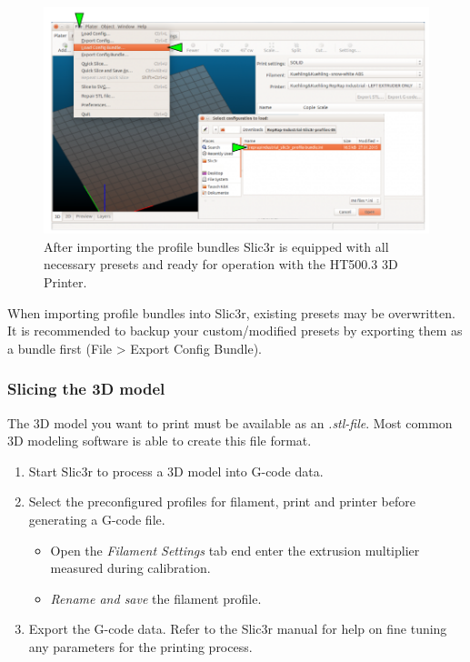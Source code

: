 \begin{figure}[H]
  \centering
  \includegraphics[width=.7\linewidth]{./img/slic3r_selectconigbundle.png}
  \caption{After importing the profile bundles Slic3r is equipped with all necessary 
           presets and ready for operation with the HT500.3 3D Printer.}
\end{figure}

\begin{info}
  When importing profile bundles into Slic3r, existing presets may be overwritten. It is recommended to backup your custom/modified presets by exporting them as a bundle first (File > Export Config Bundle).
\end{info}


\subsubsection{Slicing the 3D model}

The 3D model you want to print must be available as an \emph{.stl-file}. Most common 3D modeling software is able to create this file format.
\begin{enumerate}
  \item Start Slic3r to process a 3D model into G-code data.
  \item Select the preconfigured profiles for filament, print and printer before 
        generating a G-code file.
    \begin{itemize}
      \item Open the \emph{Filament Settings} tab end enter the extrusion multiplier measured during calibration.
      \item \emph{Rename and save} the filament profile.
    \end{itemize}
  \item Export the G-code data.
        Refer to the Slic3r manual for help on fine tuning any parameters for the printing process.
\end{enumerate}

